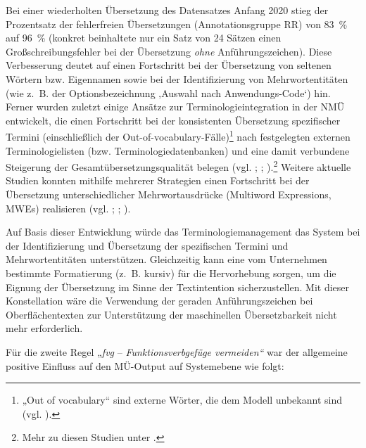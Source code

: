 Bei einer wiederholten Übersetzung des Datensatzes Anfang 2020 stieg der Prozentsatz der fehlerfreien Übersetzungen (Annotationsgruppe RR) von 83~\% auf 96~\% (konkret beinhaltete nur ein Satz von 24 Sätzen einen Großschreibungsfehler bei der Übersetzung \textit{ohne} Anführungszeichen). Diese Verbesserung deutet auf einen Fortschritt bei der Übersetzung von seltenen Wörtern bzw. Eigennamen sowie bei der Identifizierung von Mehrwortentitäten (wie z.~B. der Optionsbezeichnung ‚Auswahl nach Anwendungs-Code‘) hin. Ferner wurden zuletzt einige Ansätze zur Terminologieintegration in der NMÜ entwickelt, die einen Fortschritt bei der konsistenten Übersetzung spezifischer Termini (einschließlich der Out-of-vocabulary-Fälle)\footnote{{{{„Out of vocabulary“ sind externe Wörter, die dem Modell unbekannt sind (vgl. \citealt{Eisold2017}).}}}} nach festgelegten externen Terminologielisten (bzw. Terminologiedatenbanken) und eine damit verbundene Steigerung der Gesamtübersetzungsqualität belegen (vgl. \citealt{ChatterjeeEtAl2017}; \citealt{HaslerEtAl2018}; \citealt{DinuEtAl2019}).\footnote{{{{Mehr zu diesen Studien unter .}}}} Weitere aktuelle Studien konnten mithilfe mehrerer Strategien einen Fortschritt bei der Übersetzung unterschiedlicher Mehrwortausdrücke (Multiword Expressions, MWEs) realisieren (vgl. \citealt{GamalloGarcia2019}; \citealt{RiktersBojar2019}; \citealt{ZaninelloBirch2020}).

\largerpage
Auf Basis dieser Entwicklung würde das Terminologiemanagement das System bei der Identifizierung und Übersetzung der spezifischen Termini und Mehrwortentitäten unterstützen. Gleichzeitig kann eine vom Unternehmen bestimmte Formatierung (z.~B. kursiv) für die Hervorhebung sorgen, um die Eignung der Übersetzung im Sinne der Textintention sicherzustellen. Mit dieser Konstellation wäre die Verwendung der geraden Anführungszeichen bei Oberflächentexten zur Unterstützung der maschinellen Übersetzbarkeit nicht mehr erforderlich.

Für die zweite Regel \textit{„fvg} -- \textit{Funktionsverbgefüge vermeiden“} war der allgemeine positive Einfluss auf den MÜ-Output auf Systemebene wie folgt:

